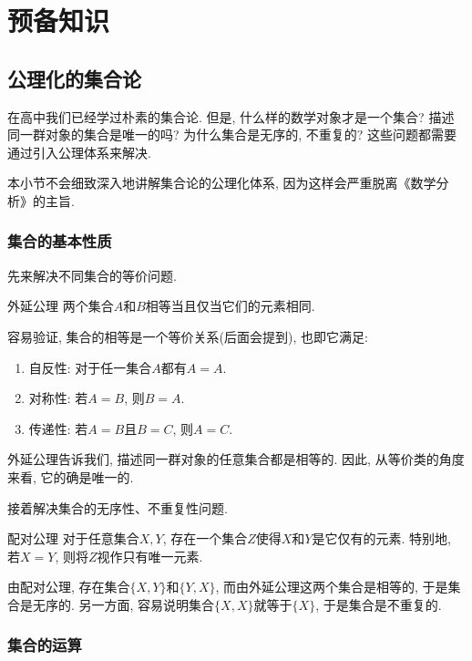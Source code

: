 \chapter{预备知识}

\section{公理化的集合论}

在高中我们已经学过朴素的集合论. 但是, 什么样的数学对象才是一个集合? 描述同一群对象的集合是唯一的吗? 为什么集合是无序的, 不重复的? 这些问题都需要通过引入公理体系来解决. 

本小节不会细致深入地讲解集合论的公理化体系, 因为这样会严重脱离《数学分析》的主旨. 

\subsection{集合的基本性质}

先来解决不同集合的等价问题. 

\begin{axiom}{外延公理}
	两个集合$A$和$B$相等当且仅当它们的元素相同.
\end{axiom}

容易验证, 集合的相等是一个等价关系(后面会提到), 也即它满足: 
\begin{enumerate}
	\item 自反性: 对于任一集合$A$都有$A=A$.
	\item 对称性: 若$A=B$, 则$B=A$.
	\item 传递性: 若$A=B$且$B=C$, 则$A=C$.
\end{enumerate}

外延公理告诉我们, 描述同一群对象的任意集合都是相等的. 因此, 从等价类的角度来看, 它的确是唯一的. 

接着解决集合的无序性、不重复性问题. 

\begin{axiom}{配对公理}
	对于任意集合$X, Y$, 存在一个集合$Z$使得$X$和$Y$是它仅有的元素. 特别地, 若$X=Y$, 则将$Z$视作只有唯一元素. 
\end{axiom}

由配对公理, 存在集合$\{ X, Y \}$和$\{ Y, X \}$, 而由外延公理这两个集合是相等的, 于是集合是无序的. 另一方面, 容易说明集合$\{ X, X \}$就等于$\{ X \}$, 于是集合是不重复的. 

\subsection{集合的运算}

